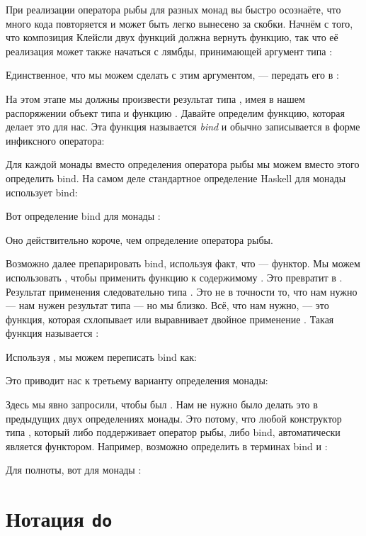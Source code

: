 При реализации оператора рыбы для разных монад вы быстро
осознаёте, что много кода повторяется и может быть легко вынесено за скобки.
Начнём с того, что композиция Клейсли двух функций должна вернуть
функцию, так что её реализация может также начаться с лямбды, принимающей
аргумент типа :

Единственное, что мы можем сделать с этим аргументом, --- передать его в :

На этом этапе мы должны произвести результат типа ,
имея в нашем распоряжении объект типа  и функцию
. Давайте определим функцию, которая
делает это для нас. Эта функция называется \emph{bind} и обычно записывается в
форме инфиксного оператора:

Для каждой монады вместо определения оператора рыбы мы можем вместо этого
определить bind. На самом деле стандартное определение Haskell для монады использует
bind:

Вот определение bind для монады :

Оно действительно короче, чем определение оператора рыбы.

Возможно далее препарировать bind, используя факт, что
 --- функтор. Мы можем использовать , чтобы применить функцию
 к содержимому . Это
превратит  в . Результат применения
следовательно типа . Это не в точности то, что нам
нужно --- нам нужен результат типа  --- но мы близко.
Всё, что нам нужно, --- это функция, которая схлопывает или выравнивает двойное
применение . Такая функция называется :

Используя , мы можем переписать bind как:

Это приводит нас к третьему варианту определения монады:

Здесь мы явно запросили, чтобы  был .
Нам не нужно было делать это в предыдущих двух определениях монады.
Это потому, что любой конструктор типа , который либо поддерживает
оператор рыбы, либо bind, автоматически является функтором. Например, возможно
определить  в терминах bind и :

Для полноты, вот  для монады :


\section{Нотация \texttt{do}}

